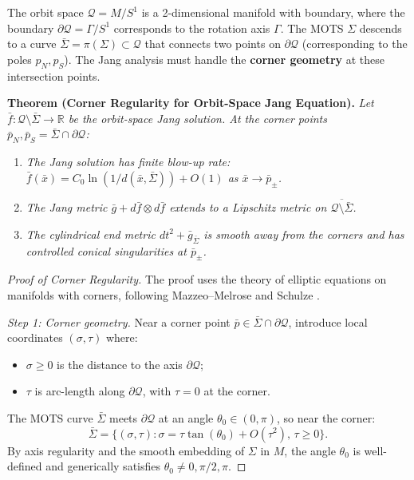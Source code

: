 \begin{remark}\label{rem:corner-regularity}
The orbit space $\mathcal{Q} = M/S^1$ is a 2-dimensional manifold with boundary, where the boundary $\partial\mathcal{Q} = \Gamma/S^1$ corresponds to the rotation axis $\Gamma$. The MOTS $\Sigma$ descends to a curve $\bar{\Sigma} = \pi(\Sigma) \subset \mathcal{Q}$ that connects two points on $\partial\mathcal{Q}$ (corresponding to the poles $p_N, p_S$). The Jang analysis must handle the \textbf{corner geometry} at these intersection points.

\textbf{Theorem (Corner Regularity for Orbit-Space Jang Equation).}
\textit{Let $\bar{f}: \mathcal{Q} \setminus \bar{\Sigma} \to \mathbb{R}$ be the orbit-space Jang solution. At the corner points $\bar{p}_N, \bar{p}_S = \bar{\Sigma} \cap \partial\mathcal{Q}$:}
\begin{enumerate}[label=\textup{(\roman*)}]
    \item \textit{The Jang solution has finite blow-up rate: $\bar{f}(\bar{x}) = C_0 \ln(1/d(\bar{x}, \bar{\Sigma})) + O(1)$ as $\bar{x} \to \bar{p}_\pm$.}
    \item \textit{The Jang metric $\bar{g} + d\bar{f} \otimes d\bar{f}$ extends to a Lipschitz metric on $\overline{\mathcal{Q} \setminus \bar{\Sigma}}$.}
    \item \textit{The cylindrical end metric $dt^2 + \bar{g}_{\bar{\Sigma}}$ is smooth away from the corners and has controlled conical singularities at $\bar{p}_\pm$.}
\end{enumerate}
\begin{proof}[Proof of Corner Regularity]
The proof uses the theory of elliptic equations on manifolds with corners, following Mazzeo--Melrose \cite{mazzeo1987} and Schulze \cite{schulze1998}.

\textit{Step 1: Corner geometry.}
Near a corner point $\bar{p} \in \bar{\Sigma} \cap \partial\mathcal{Q}$, introduce local coordinates $(\sigma, \tau)$ where:
\begin{itemize}
    \item $\sigma \geq 0$ is the distance to the axis $\partial\mathcal{Q}$;
    \item $\tau$ is arc-length along $\partial\mathcal{Q}$, with $\tau = 0$ at the corner.
\end{itemize}
The MOTS curve $\bar{\Sigma}$ meets $\partial\mathcal{Q}$ at an angle $\theta_0 \in (0, \pi)$, so near the corner:
\[
\bar{\Sigma} = \{(\sigma, \tau) : \sigma = \tau \tan(\theta_0) + O(\tau^2), \, \tau \geq 0\}.
\]
By axis regularity and the smooth embedding of $\Sigma$ in $M$, the angle $\theta_0$ is well-defined and generically satisfies $\theta_0 \neq 0, \pi/2, \pi$.


\end{proof}
\end{remark}
